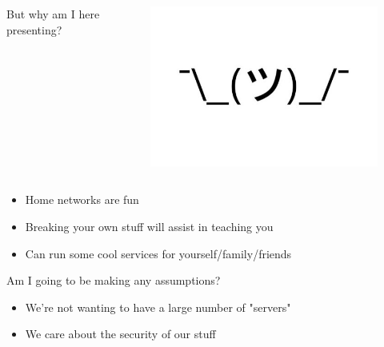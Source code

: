 \documentclass{beamer}
\begin{document}
\begin{frame}
    \begin{columns}
        \begin{column}{0.5\textwidth}
            But why am I here presenting?
        \end{column}
        \begin{column}{0.5\textwidth}
            \begin{figure}
                \centering
                \includegraphics[width=1\textwidth,keepaspectratio]{../resources/shrug.jpg}
            \end{figure}
        \end{column}
    \end{columns}
\end{frame}

\begin{frame}
    \begin{itemize}
        \item Home networks are fun
        \item Breaking your own stuff will assist in teaching you
        \item Can run some cool services for yourself/family/friends
    \end{itemize}
\end{frame}

\begin{frame}
    Am I going to be making any assumptions?
    \begin{itemize}
        \item We're not wanting to have a large number of "servers"
        \item We care about the security of our stuff
    \end{itemize}
\end{frame}
\end{document}
